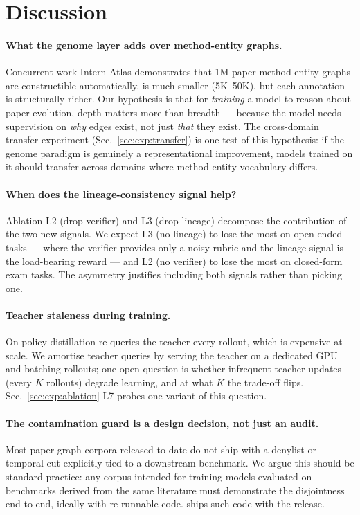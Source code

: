 \section{Discussion}
\label{sec:discussion}

\paragraph{What the genome layer adds over method-entity graphs.}
Concurrent work Intern-Atlas demonstrates that 1M-paper method-entity
graphs are constructible automatically. \genetrace{} is much smaller
(5K--50K), but each annotation is structurally richer. Our hypothesis is
that for \emph{training} a model to reason about paper evolution, depth
matters more than breadth --- because the model needs supervision on
\emph{why} edges exist, not just \emph{that} they exist. The
cross-domain transfer experiment (Sec.~\ref{sec:exp:transfer}) is one
test of this hypothesis: if the genome paradigm is genuinely a
representational improvement, models trained on it should transfer
across domains where method-entity vocabulary differs.

\paragraph{When does the lineage-consistency signal help?}
Ablation L2 (drop verifier) and L3 (drop lineage) decompose the
contribution of the two new signals. We expect L3 (no lineage) to lose
the most on open-ended tasks --- where the verifier provides only a
noisy rubric and the lineage signal is the load-bearing reward --- and
L2 (no verifier) to lose the most on closed-form exam tasks. The
asymmetry justifies including both signals rather than picking one.

\paragraph{Teacher staleness during \evoopd{} training.}
On-policy distillation re-queries the teacher every rollout, which is
expensive at scale. We amortise teacher queries by serving the teacher
on a dedicated GPU and batching rollouts; one open question is whether
infrequent teacher updates (every $K$ rollouts) degrade learning, and at
what $K$ the trade-off flips. Sec.~\ref{sec:exp:ablation} L7 probes one
variant of this question.

\paragraph{The contamination guard is a design decision, not just an
audit.} Most paper-graph corpora released to date do not ship with a
denylist or temporal cut explicitly tied to a downstream benchmark. We
argue this should be standard practice: any corpus intended for
training models evaluated on benchmarks derived from the same
literature must demonstrate the disjointness end-to-end, ideally with
re-runnable code. \genetrace{} ships such code with the release.


